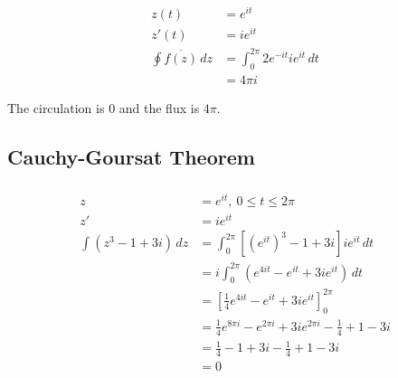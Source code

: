 \documentclass{article}
\begin{document}
\begin{align*}
  z(t)                        & = e^{i t}                                   \\
  z'(t)                       & = i e^{i t}                                 \\
  \oint \overline{f(z)} \,d z & = \int_0^{2 \pi} 2 e^{-i t} i e^{i t} \,d t \\
                              & = 4 \pi i
\end{align*}

The circulation is $0$ and the flux is $4 \pi$.

\subsection{Cauchy-Goursat Theorem}

\subsubsection{}

\begin{align*}
  z                          & = e^{i t},\ 0 \le t \le 2 \pi                                                     \\
  z'                         & = i e^{i t}                                                                       \\
  \int (z^3 - 1 + 3 i) \,d z & = \int_0^{2 \pi} [(e^{i t})^3 - 1 + 3 i] i e^{i t} \,d t                          \\
                             & = i \int_0^{2 \pi} (e^{4 i t} - e^{i t} + 3 i e^{i t}) \,d t                      \\
                             & = \left[ \frac{1}{4} e^{4 i t} - e^{i t} + 3 i e^{i t} \right]_0^{2 \pi}          \\
                             & = \frac{1}{4} e^{8 \pi i} - e^{2 \pi i} + 3 i e^{2 \pi i} - \frac{1}{4} + 1 - 3 i \\
                             & = \frac{1}{4} - 1 + 3 i - \frac{1}{4} + 1 - 3 i                                   \\
                             & = 0
\end{align*}

\setcounter{subsubsection}{8}
\subsubsection{}
\end{document}
